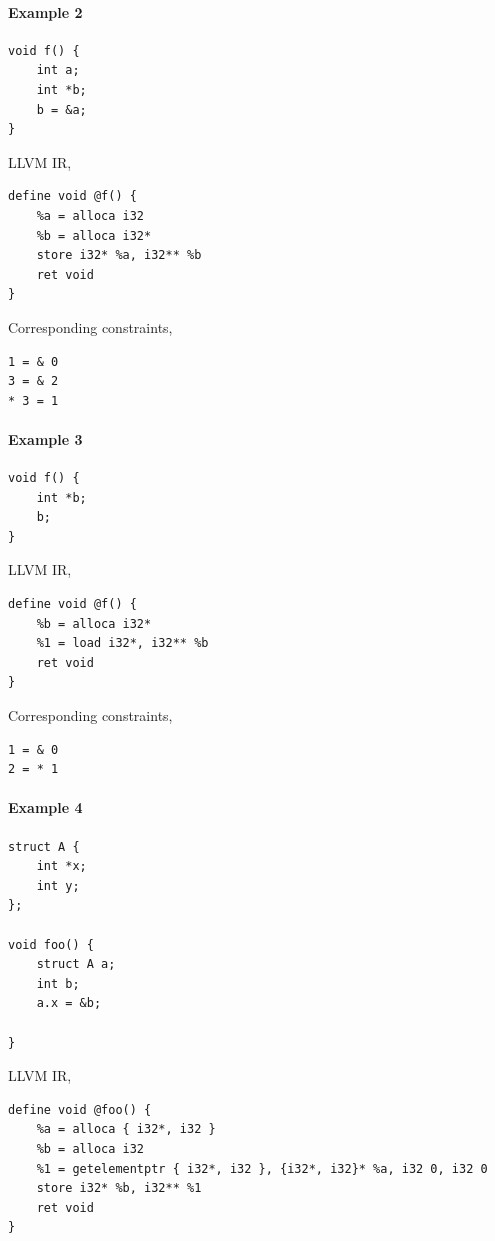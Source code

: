 \documentclass[a4paper,12pt]{report}
\begin{document}
\paragraph{Example 2}


\begin{verbatim}
void f() {
    int a;
    int *b;
    b = &a;
}
\end{verbatim}

\noindent
LLVM IR,
\begin{verbatim}
define void @f() {
    %a = alloca i32
    %b = alloca i32*
    store i32* %a, i32** %b
    ret void
}
\end{verbatim}

Corresponding constraints,
\begin{lstlisting}
1 = & 0
3 = & 2
* 3 = 1
\end{lstlisting}

\paragraph{Example 3}

\begin{verbatim}
void f() {
    int *b;
    b;
}
\end{verbatim}

\noindent
LLVM IR,
\begin{verbatim}
define void @f() {
    %b = alloca i32*
    %1 = load i32*, i32** %b
    ret void
}
\end{verbatim}

Corresponding constraints,
\begin{lstlisting}
1 = & 0
2 = * 1
\end{lstlisting}

\paragraph{Example 4}

\begin{verbatim}
struct A {
    int *x;
    int y;
};

void foo() {
    struct A a;
    int b;
    a.x = &b;

}
\end{verbatim}

\noindent
LLVM IR,
\begin{verbatim}
define void @foo() {
    %a = alloca { i32*, i32 }
    %b = alloca i32
    %1 = getelementptr { i32*, i32 }, {i32*, i32}* %a, i32 0, i32 0
    store i32* %b, i32** %1
    ret void
}
\end{verbatim}
\end{document}
